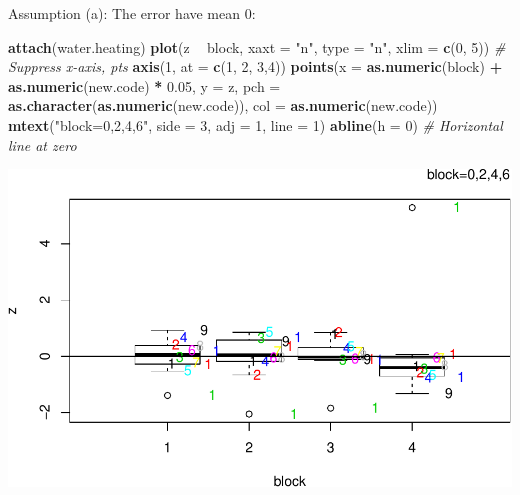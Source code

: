 \documentclass[12pt,]{article}
\newenvironment{Shaded}{\begin{snugshade}}{\end{snugshade}}
\newcommand{\KeywordTok}[1]{\textcolor[rgb]{0.13,0.29,0.53}{\textbf{#1}}}
\newcommand{\DataTypeTok}[1]{\textcolor[rgb]{0.13,0.29,0.53}{#1}}
\newcommand{\DecValTok}[1]{\textcolor[rgb]{0.00,0.00,0.81}{#1}}
\newcommand{\FloatTok}[1]{\textcolor[rgb]{0.00,0.00,0.81}{#1}}
\newcommand{\StringTok}[1]{\textcolor[rgb]{0.31,0.60,0.02}{#1}}
\newcommand{\CommentTok}[1]{\textcolor[rgb]{0.56,0.35,0.01}{\textit{#1}}}
\newcommand{\OperatorTok}[1]{\textcolor[rgb]{0.81,0.36,0.00}{\textbf{#1}}}
\newcommand{\NormalTok}[1]{#1}
\begin{document}
Assumption (a): The error have mean 0:

\begin{Shaded}
\begin{Highlighting}[]
\KeywordTok{attach}\NormalTok{(water.heating)}
\KeywordTok{plot}\NormalTok{(z }\OperatorTok{~}\StringTok{ }\NormalTok{block, }\DataTypeTok{xaxt =} \StringTok{"n"}\NormalTok{, }\DataTypeTok{type =} \StringTok{"n"}\NormalTok{, }\DataTypeTok{xlim =} \KeywordTok{c}\NormalTok{(}\DecValTok{0}\NormalTok{, }\DecValTok{5}\NormalTok{)) }\CommentTok{# Suppress x-axis, pts}
\KeywordTok{axis}\NormalTok{(}\DecValTok{1}\NormalTok{, }\DataTypeTok{at =} \KeywordTok{c}\NormalTok{(}\DecValTok{1}\NormalTok{, }\DecValTok{2}\NormalTok{, }\DecValTok{3}\NormalTok{,}\DecValTok{4}\NormalTok{))}
\KeywordTok{points}\NormalTok{(}\DataTypeTok{x =} \KeywordTok{as.numeric}\NormalTok{(block) }\OperatorTok{+}\StringTok{ }\KeywordTok{as.numeric}\NormalTok{(new.code) }\OperatorTok{*}\StringTok{ }\FloatTok{0.05}\NormalTok{, }\DataTypeTok{y =}\NormalTok{ z,}
\DataTypeTok{pch =} \KeywordTok{as.character}\NormalTok{(}\KeywordTok{as.numeric}\NormalTok{(new.code)), }\DataTypeTok{col =} \KeywordTok{as.numeric}\NormalTok{(new.code)) }
\KeywordTok{mtext}\NormalTok{(}\StringTok{"block=0,2,4,6"}\NormalTok{, }\DataTypeTok{side =} \DecValTok{3}\NormalTok{, }\DataTypeTok{adj =} \DecValTok{1}\NormalTok{, }\DataTypeTok{line =} \DecValTok{1}\NormalTok{)}
\KeywordTok{abline}\NormalTok{(}\DataTypeTok{h =} \DecValTok{0}\NormalTok{) }\CommentTok{# Horizontal line at zero}
\end{Highlighting}
\end{Shaded}

\includegraphics{Markdown_HW_8_files/figure-latex/unnamed-chunk-4-1.pdf}
\end{document}
